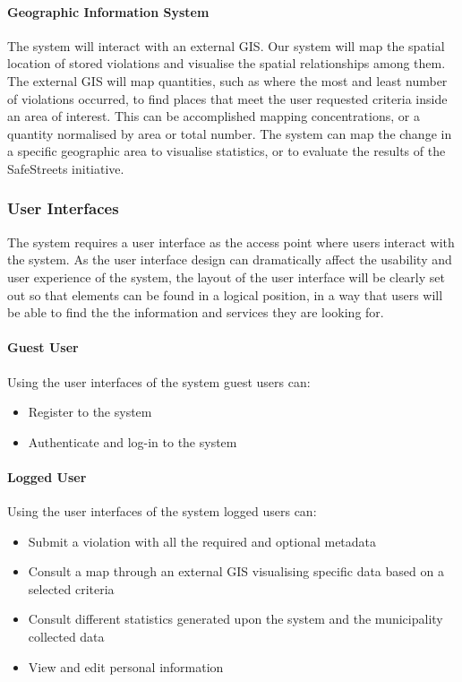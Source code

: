 \label{gis}	
\paragraph{Geographic Information System} The system will interact with an external GIS. Our system will map the spatial location of stored violations and visualise the spatial relationships among them. The external GIS will map quantities, such as where the most and least number of violations occurred, to find places that meet the user requested criteria inside an area of interest. This can be accomplished mapping concentrations, or a quantity normalised by area or total number. The system can map the change in a specific geographic area to visualise statistics, or to evaluate the results of the SafeStreets initiative.	

\subsubsection{User Interfaces}
\label{sec:userinterfaces}

The system requires a user interface as the access point where users interact with the system. As the user interface design can dramatically affect the usability and user experience of the system, the layout of the user interface will be clearly set out so that elements can be found in a logical position, in a way that users will be able to find the the information and services they are looking for.

\paragraph{Guest User}
	Using the user interfaces of the system guest users can:
	\begin{itemize}
		\item Register to the system
		\item Authenticate and log-in to the system
	\end{itemize}
	
\paragraph{Logged User}
	Using the user interfaces of the system logged users can:
	\begin{itemize}
		\item Submit a violation with all the required and optional metadata
		\item Consult a map through an external GIS visualising specific data based on a selected criteria
		\item Consult different statistics generated upon the system and the municipality collected data
		\item View and edit personal information
	\end{itemize}
		
